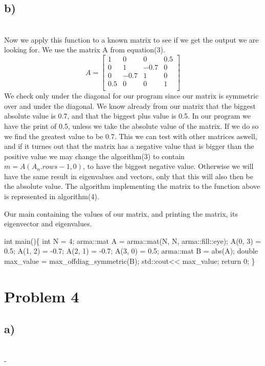 \documentclass[english,notitlepage]{revtex4-1}  %
\begin{document}
\subsection*{b)}\
\\
Now we apply this function to a known matrix to see if we get the output we are looking for. We use the matrix A from equation(3). 
\begin{equation}
A = \begin{bmatrix}
1 & 0 & 0 & 0.5\\
0 & 1 & -0.7 & 0\\
0 & -0.7 & 1 & 0\\
0.5 & 0 & 0 & 1\\
\end{bmatrix}
\end{equation}
We check only under the diagonal for our program since our matrix is symmetric over and under the diagonal. We know already from our matrix that the biggest absolute value is 0.7, and that the biggest plus value is 0.5. In our program we have the print of 0.5, unless we take the absolute value of the matrix. If we do so we find the greatest value to be 0.7. This we can test with other matrices aswell, and if it turnes out that the matrix has a negative value that is bigger than the positive value we may change the algorithm(3) to contain $m = A(A_n.rows - 1, 0)$, to have the biggest negative value. Otherwise we will have the same result in eigenvalues and vectors, only that this will also then be the absolute value. The algorithm implementing the matrix to the function above is represented in algorithm(4). 
\begin{algorithm}[H]
    \caption{Our main containing the values of our matrix, and printing the matrix, its eigenvector and eigenvalues.}\label{av_lik_lv}
    \begin{algorithmic}
    	\State int main()\{
	\State int N = 4; 
	\State arma::mat A = arma::mat(N, N, arma::fill::eye);
        \State A(0, 3) = 0.5; A(1, 2) = -0.7; A(2, 1) = -0.7; A(3, 0) = 0.5; 
        \State arma::mat B = abs(A); 
        \State double max\_value = max\_offdiag\_symmetric(B);
        \State std::cout<< max\_value;
 	\State return 0;
	\State \}
    \end{algorithmic}
\end{algorithm}

\section*{Problem 4}
\subsection*{a)}\
\\



























-
   
\end{document}
